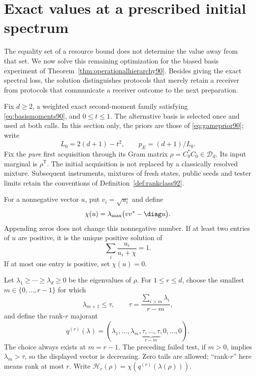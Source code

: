 \section{Exact values at a prescribed initial spectrum}
\label{sec:spectralvalue94}
The equality set of a resource bound does not determine the value away
from that set.  We now solve this remaining optimization for the biased
basis experiment of Theorem~\ref{thm:operationalhierarchy90}.  Besides
giving the exact spectral loss, the solution distinguishes protocols
that merely retain a receiver from protocols that communicate a
receiver outcome to the next preparation.

Fix $d\ge2$, a weighted exact second-moment family satisfying
\eqref{eq:basismoments90}, and $0\le t\le1$.  The alternative basis is
selected once and used at both calls.  In this section only, the priors
are those of \eqref{eq:gameprior90}; write
\[
 L_0=2(d+1)-t^2,\qquad p_E=(d+1)/L_0.
\]
Fix the \emph{pure} first acquisition through its Gram matrix
$\rho=C_0^*C_0\in\mathcal D_d$.  Its input marginal is
$\rho^{\mathsf T}$.  The initial acquisition is not replaced by a
classically resolved mixture.  Subsequent instruments, mixtures of
fresh states, public seeds and tester limits retain the conventions of
Definition~\ref{def:rankclass92}.

For a nonnegative vector $u$, put $v_i=\sqrt{u_i}$ and define
\begin{equation}\label{eq:secularmatrix94}
 \chi(u)=\lambda_{\max}\bigl(vv^*-\diag u\bigr).
\end{equation}
Appending zeros does not change this nonnegative number.  If at least
two entries of $u$ are positive, it is the unique positive solution of
\begin{equation}\label{eq:secularroot94}
                 \sum_i\frac{u_i}{u_i+\chi}=1.
\end{equation}
If at most one entry is positive, set $\chi(u)=0$.

Let $\lambda_1\ge\cdots\ge\lambda_d\ge0$ be the eigenvalues of
$\rho$.  For $1\le r\le d$, choose the smallest
$m\in\{0,\ldots,r-1\}$ for which
\[
 \lambda_{m+1}\le\tau,\qquad
 \tau=\frac{\sum_{i>m}\lambda_i}{r-m},
\]
and define the rank-$r$ majorant
\begin{equation}\label{eq:rankmajorant94}
 q^{(r)}(\lambda)
   =(\lambda_1,\ldots,\lambda_m,
               \underbrace{\tau,\ldots,\tau}_{r-m},0,\ldots,0).
\end{equation}
The choice always exists at $m=r-1$.  The preceding failed test, if
$m>0$, implies $\lambda_m>\tau$, so the displayed vector is decreasing.
Zero tails are allowed; ``rank-$r$'' here means rank at most $r$.
Write $\mathcal H_r(\rho)=\chi(q^{(r)}(\lambda(\rho)))$.

